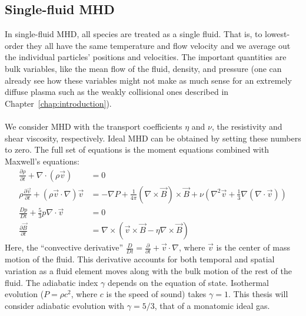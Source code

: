 \subsection{Single-fluid MHD} \label{sec:idealMHD}
In single-fluid MHD, all species are treated as a single fluid. That is, to lowest-order they all have the same temperature and flow velocity and we average out the individual particles' positions and velocities. The important quantities are bulk variables, like the mean flow of the fluid, density, and pressure (one can already see how these variables might not make as much sense for an extremely diffuse plasma such as the weakly collisional ones described in Chapter~\ref{chap:introduction}).\\
\\
We consider MHD with the transport coefficients $\eta$ and $\nu$, the resistivity and shear viscosity, respectively. Ideal MHD can be obtained by setting these numbers to zero. The full set of equations is the moment equations combined with Maxwell's equations:
\begin{align}
  \frac{\partial\rho}{\partial t}+\nabla\cdot(\rho\vec v)&=0\label{eq:continuity}\\
  \rho\frac{\partial\vec v}{\partial t}+(\rho\vec v\cdot\nabla)\vec v&=-\nabla P+\frac1{4\pi}(\nabla\times\vec B)\times\vec B+\nu\left(\nabla^2\vec v+\frac13\nabla(\nabla\cdot\vec v)\right)\label{eq:momentum}\\
  \frac{Dp}{Dt}+\frac53p\nabla\cdot\vec v&=0\\
  \frac{\partial \vec B}{\partial t}&=\nabla\times(\vec v\times\vec B-\eta\nabla\times\vec B)\label{eq:induction}
\end{align}
Here, the ``convective derivative'' $\frac{D}{Dt}=\frac{\partial}{\partial t}+\vec v\cdot\nabla$, where $\vec v$ is the center of mass motion of the fluid. This derivative accounts for both temporal and spatial variation as a fluid element moves along with the bulk motion of the rest of the fluid. The adiabatic index $\gamma$ depends on the equation of state. Isothermal evolution ($P=\rho c^2$, where $c$ is the speed of sound) takes $\gamma=1$. This thesis will consider adiabatic evolution with $\gamma=5/3$, that of a monatomic ideal gas.\\
\\
